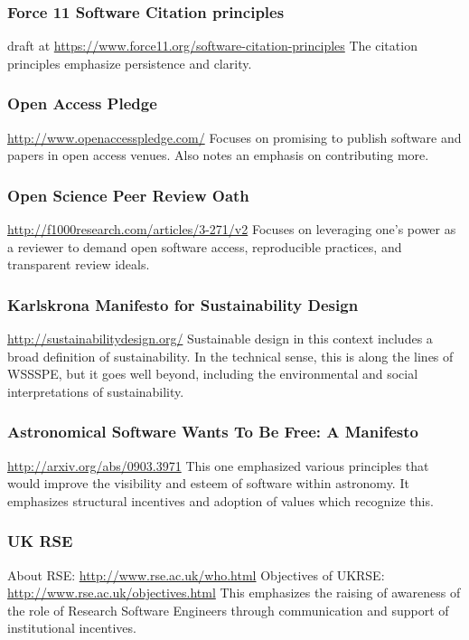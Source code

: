\documentclass[a4paper,UKenglish]{dagman}
\renewcommand{\paragraph}[1]{\subsubsection*{#1}\xspace}
\begin{document}
\begin{appendix}
\paragraph{Force 11 Software Citation principles}
draft at \url{https://www.force11.org/software-citation-principles}
\cite{arfon_m._smith_software_2016}
The citation principles emphasize persistence and clarity.

\paragraph{Open Access Pledge}
\url{http://www.openaccesspledge.com/}
\cite{alex_holcombe_open_2011}
Focuses on promising to publish software and papers in open access venues.
Also notes an emphasis on contributing more.

\paragraph{Open Science Peer Review Oath}
\url{http://f1000research.com/articles/3-271/v2}
Focuses on leveraging one's power as a reviewer to demand open software access, reproducible practices, and transparent review ideals.

\paragraph{Karlskrona Manifesto for Sustainability Design}
\url{http://sustainabilitydesign.org/}
\cite{becker_karlskrona_2014}
Sustainable design in this context includes a broad definition of sustainability. In the technical sense, this is along the lines of WSSSPE, but it goes well beyond, including the environmental and social interpretations of sustainability.

\paragraph{Astronomical Software Wants To Be Free: A Manifesto}
\url{http://arxiv.org/abs/0903.3971}
\cite{weiner_astronomical_2009}
This one emphasized various principles that would improve the visibility and esteem of software within astronomy. It emphasizes structural incentives and adoption of values which recognize this. 

\paragraph{UK RSE}
About RSE: \url{http://www.rse.ac.uk/who.html}
\cite{rse_conference_2016_what_2016}
Objectives of UKRSE: \url{http://www.rse.ac.uk/objectives.html}
This emphasizes the raising of awareness of the role of Research Software Engineers through communication and support of institutional incentives.


\end{appendix}
\end{document}
